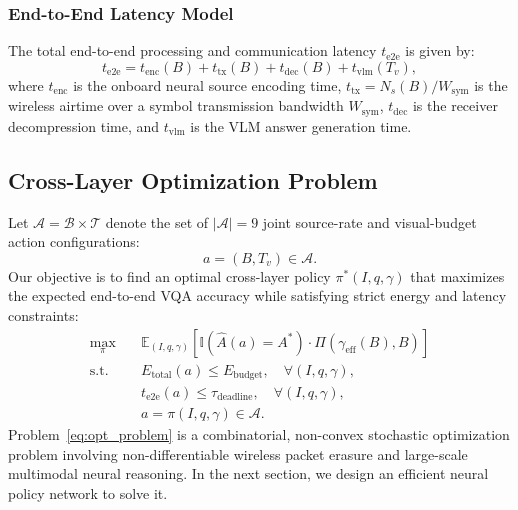 \subsubsection{End-to-End Latency Model}
The total end-to-end processing and communication latency $t_{\mathrm{e2e}}$ is given by:
\begin{equation}\label{eq:latency}
t_{\mathrm{e2e}} = t_{\mathrm{enc}}(B) + t_{\mathrm{tx}}(B) + t_{\mathrm{dec}}(B) + t_{\mathrm{vlm}}(T_v),
\end{equation}
where $t_{\mathrm{enc}}$ is the onboard neural source encoding time, $t_{\mathrm{tx}} = N_s(B) / W_{\mathrm{sym}}$ is the wireless airtime over a symbol transmission bandwidth $W_{\mathrm{sym}}$, $t_{\mathrm{dec}}$ is the receiver decompression time, and $t_{\mathrm{vlm}}$ is the VLM answer generation time.

\subsection{Cross-Layer Optimization Problem}
Let $\mathcal{A} = \mathcal{B} \times \mathcal{T}$ denote the set of $|\mathcal{A}| = 9$ joint source-rate and visual-budget action configurations:
\begin{equation}
a = (B, T_v) \in \mathcal{A}.
\end{equation}
Our objective is to find an optimal cross-layer policy $\pi^*(I, q, \gamma)$ that maximizes the expected end-to-end VQA accuracy while satisfying strict energy and latency constraints:
\begin{subequations}\label{eq:opt_problem}
\begin{align}
\max_{\pi} \quad & \mathbb{E}_{(I, q, \gamma)}\left[ \mathbb{I}(\hat{A}(a) = A^*) \cdot \Pi(\gamma_{\mathrm{eff}}(B), B) \right] \label{eq:opt_obj} \\
\text{s.t.} \quad & E_{\mathrm{total}}(a) \le E_{\mathrm{budget}}, \quad \forall (I, q, \gamma), \label{eq:cons_energy} \\
& t_{\mathrm{e2e}}(a) \le \tau_{\mathrm{deadline}}, \quad \forall (I, q, \gamma), \label{eq:cons_latency} \\
& a = \pi(I, q, \gamma) \in \mathcal{A}. \label{eq:cons_action}
\end{align}
\end{subequations}
Problem~\eqref{eq:opt_problem} is a combinatorial, non-convex stochastic optimization problem involving non-differentiable wireless packet erasure and large-scale multimodal neural reasoning. In the next section, we design an efficient neural policy network to solve it.
